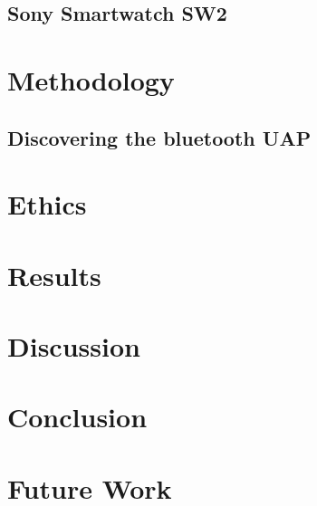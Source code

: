 \documentclass{article}
\begin{document}
	\subsection{Sony Smartwatch SW2}
	
\section{Methodology}

\subsection{Discovering the bluetooth UAP}

\section{Ethics}

\section{Results}

\section{Discussion}

\section{Conclusion}

\section{Future Work}




\vspace*{2\baselineskip} %



\end{document}
